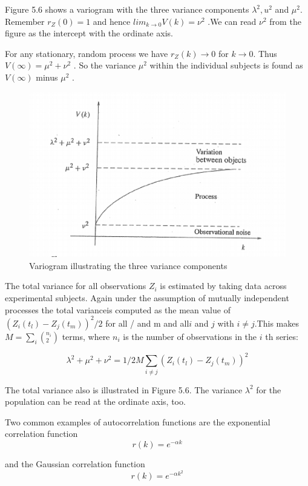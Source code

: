  
   Figure 5.6 shows a variogram with the three variance components $ \lambda^{2} ,u^{2}$ and $ \mu^{2} $. Remember $ r_{Z}(0)=1 $  and hence $ lim_{k\rightarrow 0}V(k)=\nu^{2} $ .We can read $ \nu^{2} $ from the figure as the intercept with the ordinate axis.
 
  For any stationary, random process we have $ r_{Z}(k)\rightarrow 0 $ for $ k\rightarrow 0 $. Thus $ V(\infty)=\mu^{2}+\nu^{2} $ . So the variance $\mu^{2} $ within the individual subjects is found as $ V(\infty) $ minus $ \mu^{2} $ .
 
 
 \begin{figure}[h]
 	\centering
 	\includegraphics[width=0.7\linewidth]{TeX_files/Part02/chapter05/image/10}
 	\caption{Variogram illustrating the three variance components}
 	\label{ }
 \end{figure}
 
 
 The total variance for all observations $ Z_{i} $ is estimated by taking data across experimental subjects. Again under the assumption of mutually independent processes the total varianceis computed as the mean value of $ (Z_{i}(t_{l})-Z_{j}(t_{m}))^{2}/2 $ for all / and m and all$  i $ and $ j $ with $ i\neq j $.This makes $ M=\sum\nolimits_{i}(_{2}^{n_{i}}) $ terms, where $ n_{i} $ is the number of observations in the $ i $ th series: 
 
 \[ \lambda^{2}+\mu^{2}+\nu^{2}=1/2M \sum_{i\neq j}(Z_{i}(t_{l})-Z_{j}(t_{m}))^{2} \]
 
 The total variance also is illustrated in Figure 5.6. The variance $ \lambda^{2} $ for the population can be read at the ordinate axis, too.
 
 Two common examples of autocorrelation functions are the exponential correlation function
 \begin{equation}\label{5.38}
  r(k)=e^{-\alpha k}
 \end{equation}
  
 
 and the Gaussian correlation function
 \begin{equation}\label{5.39}
  r(k)=e^{-\alpha k^{2}}
 \end{equation}
 

